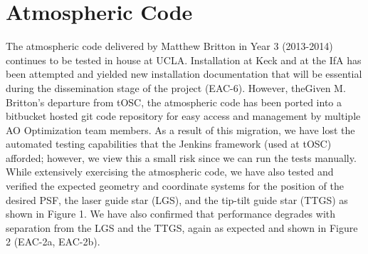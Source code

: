 \section{Atmospheric Code}
\label{ref:atmospheric_code}

The atmospheric code delivered by Matthew Britton in Year 3 (2013-2014) continues to be tested in house at UCLA. Installation at Keck and at the IfA has been attempted and yielded new installation documentation that will be essential during the dissemination stage of the project (EAC-6). However, theGiven M. Britton’s departure from tOSC, the atmospheric code has been ported into a bitbucket hosted git code repository for easy access and management by multiple AO Optimization team members. As a result of this migration, we have lost the automated testing capabilities that the Jenkins framework (used at tOSC) afforded; however, we view this a small risk since we can run the tests manually. While extensively exercising the atmospheric code, we have also tested and verified the expected geometry and coordinate systems for the position of the desired PSF, the laser guide star (LGS), and the tip-tilt guide star (TTGS) as shown in Figure 1. We have also confirmed that performance degrades with separation from the LGS and the TTGS, again as expected and shown in Figure 2 (EAC-2a, EAC-2b).  